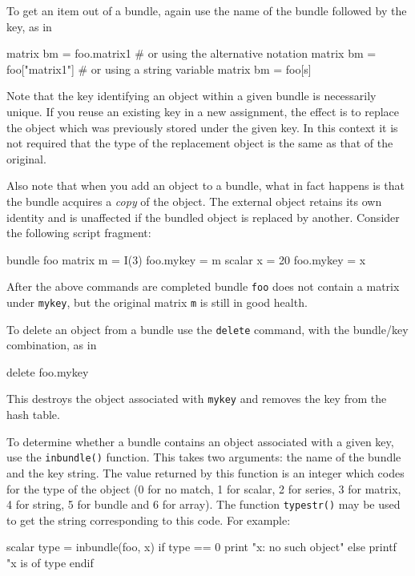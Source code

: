 To get an item out of a bundle, again use the name of the bundle
followed by the key, as in

\begin{code}
matrix bm = foo.matrix1
# or using the alternative notation
matrix bm = foo["matrix1"]
# or using a string variable
matrix bm = foo[s]
\end{code}

Note that the key identifying an object within a given bundle is
necessarily unique. If you reuse an existing key in a new assignment,
the effect is to replace the object which was previously stored under
the given key. In this context it is not required that the type of the
replacement object is the same as that of the original.

Also note that when you add an object to a bundle, what in fact
happens is that the bundle acquires a \textit{copy} of the object. The
external object retains its own identity and is unaffected if the
bundled object is replaced by another. Consider the following script
fragment:

\begin{code}
bundle foo
matrix m = I(3)
foo.mykey = m
scalar x = 20
foo.mykey = x
\end{code}

After the above commands are completed bundle \texttt{foo} does not
contain a matrix under \texttt{mykey}, but the original matrix
\texttt{m} is still in good health.

To delete an object from a bundle use the \texttt{delete} command,
with the bundle/key combination, as in

\begin{code}
delete foo.mykey
\end{code}

This destroys the object associated with \texttt{mykey} and removes
the key from the hash table.

To determine whether a bundle contains an object associated with a
given key, use the \texttt{inbundle()} function. This takes two
arguments: the name of the bundle and the key string. The value
returned by this function is an integer which codes for the type of
the object (0 for no match, 1 for scalar, 2 for series, 3 for matrix,
4 for string, 5 for bundle and 6 for array). The function
\texttt{typestr()} may be used to get the string corresponding to this
code. For example:

\begin{code}
scalar type = inbundle(foo, x)
if type == 0
  print "x: no such object"
else
  printf "x is of type %
endif
\end{code}

